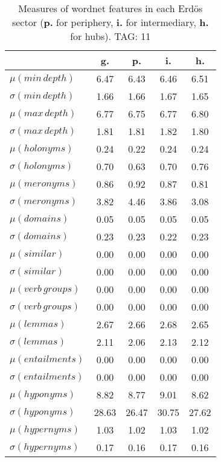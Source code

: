 \begin{table}[h!]
\begin{center}
\begin{tabular}{| l | c | c | c | c |}\hline
 & g. & p. & i. & h. \\\hline
$\mu(min\,depth)$ & 6.47  & 6.43  & 6.46  & 6.51 \\\hline
$\sigma(min\,depth)$ & 1.66  & 1.66  & 1.67  & 1.65 \\\hline
$\mu(max\,depth)$ & 6.77  & 6.75  & 6.77  & 6.80 \\\hline
$\sigma(max\,depth)$ & 1.81  & 1.81  & 1.82  & 1.80 \\\hline
$\mu(holonyms)$ & 0.24  & 0.22  & 0.24  & 0.24 \\\hline
$\sigma(holonyms)$ & 0.70  & 0.63  & 0.70  & 0.76 \\\hline
$\mu(meronyms)$ & 0.86  & 0.92  & 0.87  & 0.81 \\\hline
$\sigma(meronyms)$ & 3.82  & 4.46  & 3.86  & 3.08 \\\hline
$\mu(domains)$ & 0.05  & 0.05  & 0.05  & 0.05 \\\hline
$\sigma(domains)$ & 0.23  & 0.23  & 0.22  & 0.23 \\\hline
$\mu(similar)$ & 0.00  & 0.00  & 0.00  & 0.00 \\\hline
$\sigma(similar)$ & 0.00  & 0.00  & 0.00  & 0.00 \\\hline
$\mu(verb\,groups)$ & 0.00  & 0.00  & 0.00  & 0.00 \\\hline
$\sigma(verb\,groups)$ & 0.00  & 0.00  & 0.00  & 0.00 \\\hline
$\mu(lemmas)$ & 2.67  & 2.66  & 2.68  & 2.65 \\\hline
$\sigma(lemmas)$ & 2.11  & 2.06  & 2.13  & 2.12 \\\hline
$\mu(entailments)$ & 0.00  & 0.00  & 0.00  & 0.00 \\\hline
$\sigma(entailments)$ & 0.00  & 0.00  & 0.00  & 0.00 \\\hline
$\mu(hyponyms)$ & 8.82  & 8.77  & 9.01  & 8.62 \\\hline
$\sigma(hyponyms)$ & 28.63  & 26.47  & 30.75  & 27.62 \\\hline
$\mu(hypernyms)$ & 1.03  & 1.02  & 1.03  & 1.02 \\\hline
$\sigma(hypernyms)$ & 0.17  & 0.16  & 0.17  & 0.16 \\\hline
\end{tabular}
\caption{Measures of wordnet features in each Erd\"os sector ({{\bf p.}} for periphery, {{\bf i.}} for intermediary, {{\bf h.}} for hubs). TAG: 11}
\end{center}
\end{table}